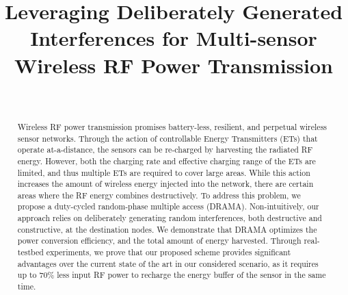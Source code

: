\documentclass[conference]{IEEEtran}
\begin{document}
\title{{Leveraging Deliberately Generated Interferences for Multi-sensor Wireless RF Power Transmission}}



\author{

\vspace{0.2cm}
 \\

}

\maketitle


\begin{abstract}
Wireless RF power transmission promises battery-less, resilient, and perpetual wireless sensor networks. Through the action of controllable Energy Transmitters (ETs) that operate at-a-distance, the sensors can be re-charged by harvesting the radiated RF energy. However, both the charging rate and effective charging range of the ETs are limited, and thus multiple ETs are required to cover large areas. While this action increases the amount of wireless energy injected into the network, there are certain areas where the RF energy combines destructively. To address this problem, we propose a duty-cycled random-phase multiple access (DRAMA). Non-intuitively, our approach relies on deliberately generating random interferences, both destructive and constructive, at the destination nodes. We demonstrate that DRAMA optimizes the power conversion efficiency, and the total amount of energy harvested. 
Through real-testbed experiments, we prove that our proposed scheme provides significant advantages over the current state of the art in our considered scenario, as it requires up to 70\% less input RF power to recharge the energy buffer of the sensor in the same time. 
\end{abstract}
\end{document}

